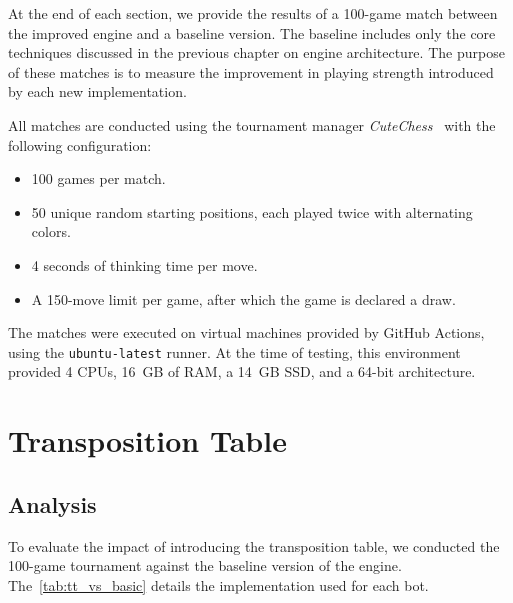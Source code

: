 \vspace{1em}

\noindent At the end of each section, we provide the results of a 100-game match between the improved engine and a baseline version. The baseline includes only the core techniques discussed in the previous chapter on engine architecture. The purpose of these matches is to measure the improvement in playing strength introduced by each new implementation.

\vspace{1em}

\noindent All matches are conducted using the tournament manager \textit{CuteChess}~\cite{CuteChess} with the following configuration:

\begin{itemize}[itemsep=1pt]
\item 100 games per match.
\item 50 unique random starting positions, each played twice with alternating colors.
\item 4 seconds of thinking time per move.
\item A 150-move limit per game, after which the game is declared a draw.
\end{itemize}

\noindent The matches were executed on virtual machines provided by GitHub Actions, using the \texttt{ubuntu-latest} runner. At the time of testing, this environment provided 4 CPUs, 16~GB of RAM, a 14~GB SSD, and a 64-bit architecture.

\section{Transposition Table}\label{sec:tt}

\subsection{Analysis}

\noindent To evaluate the impact of introducing the transposition table, we conducted the 100-game tournament against the baseline version of the engine. The~\cref{tab:tt_vs_basic} details the implementation used for each bot.

\vspace{1em}


